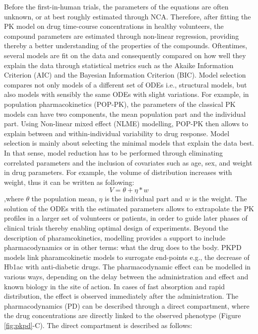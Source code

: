 Before the first-in-human trials, the parameters of the equations are often unknown, or at best roughly estimated through NCA. Therefore, after fitting the PK model on drug time-course concentrations in healthy volunteers, the compound parameters are estimated through non-linear regression, providing thereby a better understanding of the properties of the compounds. Oftentimes, several models are fit on the data and consequently compared on how well they explain the data through statistical metrics such as the Akaike Information Criterion (AIC) and the Bayesian Information Criterion (BIC). Model selection compares not only models of a different set of ODEs i.e., structural models, but also models with sensibly the same ODEs with slight variations. For example, in population pharmacokinetics (POP-PK), the parameters of the classical PK models can have two components, the mean population part and the individual part. Using Non-linear mixed effect (NLME) modelling, POP-PK then allows to explain between and within-individual variability to drug response. Model selection is mainly about selecting the minimal models that explain the data best. In that sense, model reduction has to be performed through eliminating correlated parameters and the inclusion of covariates such as age, sex, and weight in drug parameters. For example, the volume of distribution increases with weight, thus it can be written as following:
\begin{equation}
V= \theta + \eta*w
\end{equation}
,where $\theta$ the population mean, $\eta$ is the individual part and $w$ is the weight.  
The solution of the ODEs with the estimated parameters allows to extrapolate the PK profiles in a larger set of volunteers or patients, in order to guide later phases of clinical trials thereby enabling optimal design of experiments.
Beyond the description of pharamcokinetics, modelling provides a support to include pharmacodynamics or in other terms: what the drug does to the body. PKPD models link pharamcokinetic models to surrogate end-points e.g., the decrease of Hb1ac with anti-diabetic drugs. The pharmacodynamic effect can be modelled in various ways, depending on the delay between the administration and effect and known biology in the site of action. In cases of fast absorption and rapid distribution, the effect is observed immediately after the administration. The pharmacodynamics (PD) can be described through a direct compartment, where the drug concentrations  are directly linked to the observed phenotype \cite{upton2014basic} (Figure \ref{fig:pkpd}-C). The direct compartment is described as follows:
